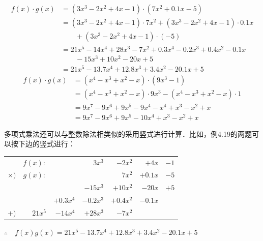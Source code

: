 \begin{solution}
\[\begin{split}
        f(x)\cdot g(x)&=(3x^3-2x^2+4x-1)\cdot (7x^2+0.1x-5)\\
        &=(3x^3-2x^2+4x-1)\cdot 7x^2+(3x^3-2x^2+4x-1)\cdot 0.1x\\
        &\qquad +(3x^3-2x^2+4x-1)\cdot (-5)\\
&=21x^5-14x^4+28x^3-7x^2+0.3x^4-0.2x^3+0.4x^2-0.1x\\
&\qquad -15x^3+10x^2-20x+5\\
&=21x^5-13.7x^4+12.8x^3+3.4x^2-20.1x+5
    \end{split}\]
\[\begin{split}
    f(x)\cdot g(x)&=(x^4-x^3+x^2-x)\cdot (9x^3-1)\\
    &=(x^4-x^3+x^2-x)\cdot 9x^3-(x^4-x^3+x^2-x)\cdot 1\\
    &=9x^7-9x^6+9x^5-9x^4-x^4+x^3-x^2+x\\
    &=9x^7-9x^6+9x^5-10x^4+x^3-x^2+x
\end{split}\]
\end{solution}

多项式乘法还可以与整数除法相类似的采用竖式进行计算．比如，例4.19的两题可以按下边的竖式进行：
    \begin{center}
        \begin{tabular}{rrrrrrr}
           &    $f(x):$    &        &    $3x^3$    &    $-2x^2$    &    $+4x$    &    $-1$\\
        $\times)$    &    $g(x):$    &        &        &    $7x^2$    &    $+0.1x$    &    $-5$\\
        \hline
            &        &        &    $-15x^3$    &    $+10x^2$    &    $-20x$    &    $+5$\\
            &        &    $+0.3x^4$    &    $-0.2x^3$    &    $+0.4x^2$    &    $-0.1x$    &    \\
        $+)$    &    $21x^5$    &    $-14x^4$    &    $+28x^3$    &    $-7x^2$    &        &    \\
        \hline
        \end{tabular}
    \end{center}   

        $\therefore\quad f(x)g(x)=21x^5-13.7x^4+12.8x^3+3.4x^2-20.1x+5$

